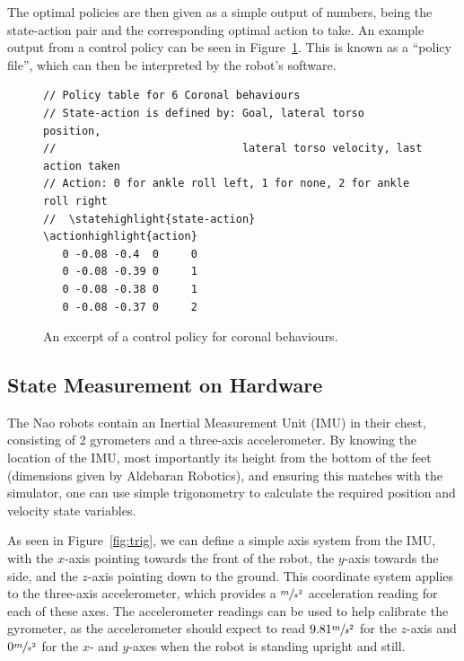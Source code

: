 The optimal policies are then given as a simple output of numbers, being the state-action pair and the corresponding optimal action to take. An example output from a control policy can be seen in Figure~\ref{fig:policy}. This is known as a ``policy file'', which can then be interpreted by the robot's software.

\begin{figure}[h]
\newcommand\statehighlight[1]{\textcolor[rgb]{1,0,0}{#1}}
\newcommand\actionhighlight[1]{\textcolor[rgb]{0,0,1}{#1}}
\begin{Verbatim}[commandchars=\\\{\},frame=single]
// Policy table for 6 Coronal behaviours
// State-action is defined by: Goal, lateral torso position, 
//                             lateral torso velocity, last action taken
// Action: 0 for ankle roll left, 1 for none, 2 for ankle roll right
//  \statehighlight{state-action}    \actionhighlight{action}
   0 -0.08 -0.4  0     0
   0 -0.08 -0.39 0     1
   0 -0.08 -0.38 0     1
   0 -0.08 -0.37 0     2
\end{Verbatim}
\vspace{-20pt}
\caption{An excerpt of a control policy for coronal behaviours.}
\label{fig:policy}
\vspace{-10pt}
\end{figure}

\subsection{State Measurement on Hardware}

The Nao robots contain an Inertial Measurement Unit (IMU) in their chest, consisting of 2 gyrometers and a three-axis accelerometer.\cite{nao_imu} By knowing the location of the IMU, most importantly its height from the bottom of the feet (dimensions given by Aldebaran Robotics), and ensuring this matches with the simulator, one can use simple trigonometry to calculate the required position and velocity state variables. 

As seen in Figure~\ref{fig:trig}, we can define a simple axis system from the IMU, with the $x$-axis pointing towards the front of the robot, the $y$-axis towards the side, and the $z$-axis pointing down to the ground. This coordinate system applies to the three-axis accelerometer, which provides a $\sfrac{m}{s^2}$ acceleration reading for each of these axes. The accelerometer readings can be used to help calibrate the gyrometer, as the accelerometer should expect to read $9.81\sfrac{m}{s^2}$ for the $z$-axis and $0\sfrac{m}{s^2}$ for the $x$- and $y$-axes when the robot is standing upright and still.

